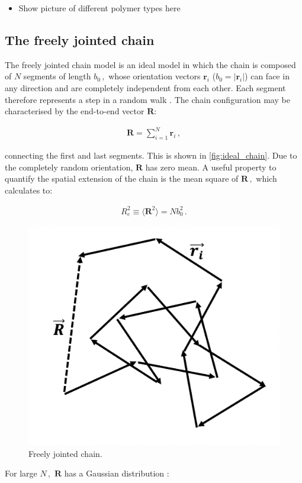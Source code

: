 \documentclass[bachelor,       %
               oneside,        %
               BCOR10mm,       %
               ngerman, english %
               ]{GAUBM}
\begin{document}
\begin{itemize}
    \item Show picture of different polymer types here
\end{itemize}

\subsection{The freely jointed chain}

The freely jointed chain model is an ideal model in which the chain is composed of $N$ segments of length $b_0\,,$ whose orientation vectors $\mathbf r_i$ ($b_0=|\mathbf r_i|$) can face in any direction and are completely independent from each other. Each segment therefore represents a step in a random walk \cite{Doi_edwards}. The chain configuration may be characterised by the end-to-end vector $\mathbf R$:

\begin{align}
    \mathbf R=\sum_{i=1}^{N}\mathbf r_i\,,
\end{align}

connecting the first and last segments. This is shown in \autoref{fig:ideal_chain}. Due to the completely random orientation, $\mathbf R$ has zero mean. A useful property to quantify the spatial extension of the chain is the mean square of $\mathbf R\,,$ which calculates to:

\begin{align}
    R_e^2\equiv \langle\mathbf R^2\rangle=Nb_0^2\,.
    \label{eq:Re}
\end{align}

\begin{figure}[h]
  \centering
  \includegraphics[width=0.5\linewidth]{figures/ideal_chain.png}
  \caption{Freely jointed chain.}
  \label{fig:ideal_chain}
\end{figure}

For large $N\,,$ $\mathbf R$ has a Gaussian distribution \cite{Rubin03}:
 
\end{document}
